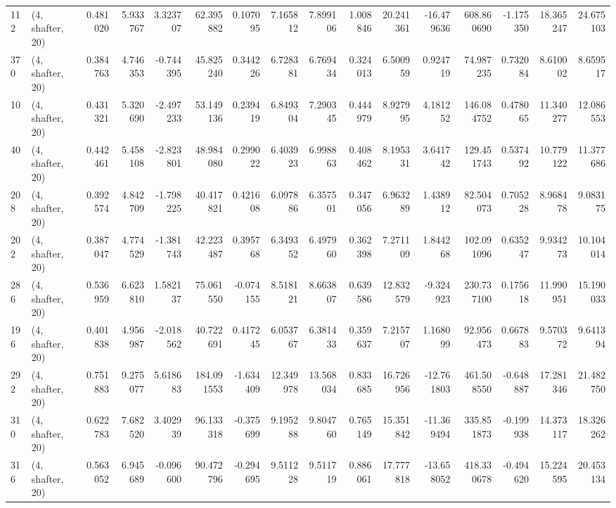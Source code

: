 \begin{tabular}{llrrrrrrrrrrrrrr}
112 &  (4, shafter, 20) &   0.481020 &   5.933767 &   3.323707 &    62.395882 &   0.107095 &   7.165812 &   7.899106 &  1.008846 &  20.241361 & -16.479636 &   608.860690 & -1.175350 &  18.365247 &  24.675103 \\
370 &  (4, shafter, 20) &   0.384763 &   4.746353 &  -0.744395 &    45.825240 &   0.344226 &   6.728381 &   6.769434 &  0.324013 &   6.500959 &   0.924719 &    74.987235 &  0.732084 &   8.610002 &   8.659517 \\
10  &  (4, shafter, 20) &   0.431321 &   5.320690 &  -2.497233 &    53.149136 &   0.239419 &   6.849304 &   7.290345 &  0.444979 &   8.927995 &   4.181252 &   146.084752 &  0.478065 &  11.340277 &  12.086553 \\
40  &  (4, shafter, 20) &   0.442461 &   5.458108 &  -2.823801 &    48.984080 &   0.299022 &   6.403923 &   6.998863 &  0.408462 &   8.195331 &   3.641742 &   129.451743 &  0.537492 &  10.779122 &  11.377686 \\
208 &  (4, shafter, 20) &   0.392574 &   4.842709 &  -1.798225 &    40.417821 &   0.421608 &   6.097886 &   6.357501 &  0.347056 &   6.963289 &   1.438912 &    82.504073 &  0.705228 &   8.968478 &   9.083175 \\
202 &  (4, shafter, 20) &   0.387047 &   4.774529 &  -1.381743 &    42.223487 &   0.395768 &   6.349352 &   6.497960 &  0.362398 &   7.271109 &   1.844268 &   102.091096 &  0.635247 &   9.934273 &  10.104014 \\
286 &  (4, shafter, 20) &   0.536959 &   6.623810 &   1.582137 &    75.061550 &  -0.074155 &   8.518121 &   8.663807 &  0.639586 &  12.832579 &  -9.324923 &   230.737100 &  0.175618 &  11.990951 &  15.190033 \\
196 &  (4, shafter, 20) &   0.401838 &   4.956987 &  -2.018562 &    40.722691 &   0.417245 &   6.053767 &   6.381433 &  0.359637 &   7.215707 &   1.168099 &    92.956473 &  0.667883 &   9.570372 &   9.641394 \\
292 &  (4, shafter, 20) &   0.751883 &   9.275077 &   5.618683 &   184.091553 &  -1.634409 &  12.349978 &  13.568034 &  0.833685 &  16.726956 & -12.761803 &   461.508550 & -0.648887 &  17.281346 &  21.482750 \\
310 &  (4, shafter, 20) &   0.622783 &   7.682520 &   3.402939 &    96.133318 &  -0.375699 &   9.195288 &   9.804760 &  0.765149 &  15.351842 & -11.369494 &   335.851873 & -0.199938 &  14.373117 &  18.326262 \\
316 &  (4, shafter, 20) &   0.563052 &   6.945689 &  -0.096600 &    90.472796 &  -0.294695 &   9.511228 &   9.511719 &  0.886061 &  17.777818 & -13.658052 &   418.330678 & -0.494620 &  15.224595 &  20.453134 \\

\end{tabular}
